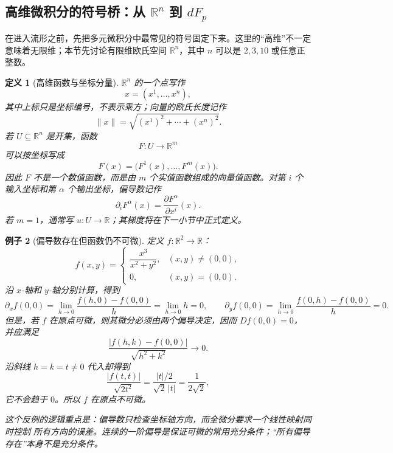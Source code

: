 \documentclass[UTF8,fontset=none,a4paper,11pt]{ctexart}
\theoremstyle{foundation-definition}
\newtheorem{definition}{定义}[section]
\theoremstyle{foundation-theorem}
\theoremstyle{foundation-proposition}
\theoremstyle{foundation-example}
\newtheorem{example}[definition]{例子}
\theoremstyle{foundation-remark}
\theoremstyle{foundation-theorem}
\begin{document}
\subsection{\texorpdfstring{高维微积分的符号桥：从 \(\mathbb R^n\) 到 \(dF_p\)}{高维微积分的符号桥：从 Rn 到 dFp}}

在进入流形之前，先把多元微积分中最常见的符号固定下来。这里的“高维”不一定意味着无限维；本节先讨论有限维欧氏空间 \(\mathbb R^n\)，其中 \(n\) 可以是 \(2,3,10\) 或任意正整数。

\begin{definition}[高维函数与坐标分量]\label{def:multivariable-calculus}
\(\mathbb R^n\) 的一个点写作
\[
x=(x^1,\ldots,x^n),
\]
其中上标只是坐标编号，不表示乘方；向量的欧氏长度记作
\[
\|x\|=\sqrt{(x^1)^2+\cdots+(x^n)^2}.
\]
若 \(U\subseteq\mathbb R^n\) 是开集，函数
\[
F:U\longrightarrow\mathbb R^m
\]
可以按坐标写成
\[
F(x)=\bigl(F^1(x),\ldots,F^m(x)\bigr).
\]
因此 \(F\) 不是一个数值函数，而是由 \(m\) 个实值函数组成的向量值函数。对第 \(i\) 个输入坐标和第 \(\alpha\) 个输出坐标，偏导数记作
\[
\partial_iF^\alpha(x)=\frac{\partial F^\alpha}{\partial x^i}(x).
\]
若 \(m=1\)，通常写 \(u:U\to\mathbb R\)；其梯度将在下一小节中正式定义。
\end{definition}

\begin{example}[偏导数存在但函数仍不可微]\label{ex:partial-not-differentiable}
定义 \(f:\mathbb R^2\to\mathbb R\)：
\[
f(x,y)=
\begin{cases}
\dfrac{x^3}{x^2+y^2},&(x,y)\ne(0,0),\\[0.4em]
0,&(x,y)=(0,0).
\end{cases}
\]
沿 \(x\)-轴和 \(y\)-轴分别计算，得到
\[
\partial_xf(0,0)
=\lim_{h\to0}\frac{f(h,0)-f(0,0)}h
=\lim_{h\to0}h=0,
\qquad
\partial_yf(0,0)
=\lim_{h\to0}\frac{f(0,h)-f(0,0)}h
=0.
\]
但是，若 \(f\) 在原点可微，则其微分必须由两个偏导决定，因而 \(Df(0,0)=0\)，
并应满足
\[
\frac{|f(h,k)-f(0,0)|}{\sqrt{h^2+k^2}}\longrightarrow0.
\]
沿斜线 \(h=k=t\ne0\) 代入却得到
\[
\frac{|f(t,t)|}{\sqrt{2t^2}}
=\frac{|t|/2}{\sqrt2\,|t|}
=\frac1{2\sqrt2},
\]
它不会趋于 \(0\)。所以 \(f\) 在原点不可微。

这个反例的逻辑重点是：偏导数只检查坐标轴方向，而全微分要求一个线性映射同时控制
所有方向的误差。连续的一阶偏导是保证可微的常用充分条件；“所有偏导存在”本身不是充分条件。
\end{example}
\end{document}
